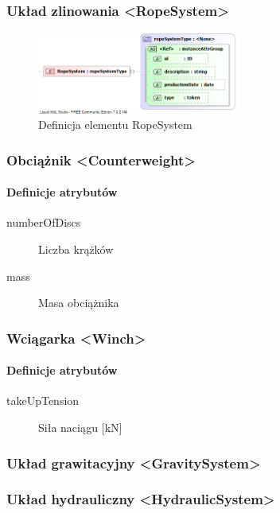 \documentclass[12pt,a4paper]{article}
\begin{document}
\subsubsection{Układ zlinowania <RopeSystem>}

\begin{figure}[H]
  \centering
  \includegraphics[width=0.6\textwidth]{png/liquid/RopeSystem}
  \caption{Definicja elementu RopeSystem}
  \label{fig:ropeSystem-xsd}
\end{figure}


\subsubsection{Obciążnik <Counterweight>}

\paragraph{Definicje atrybutów}
\begin{description}
\item[numberOfDiscs] Liczba krążków
\item[mass] Masa obciążnika
\end{description}


\subsubsection{Wciągarka <Winch>}

\paragraph{Definicje atrybutów}
\begin{description}
\item[takeUpTension] Siła naciągu [kN]
\end{description}


\subsubsection{Układ grawitacyjny <GravitySystem>}


\subsubsection{Układ hydrauliczny <HydraulicSystem>}
\end{document}
